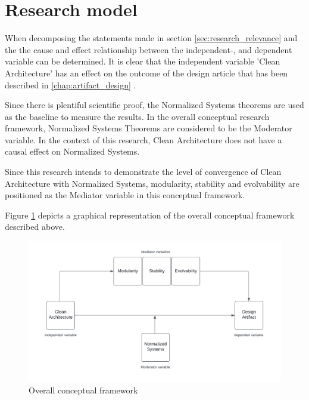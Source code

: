 \section{Research model} \label{research_model}

When decomposing the statements made in section \ref{sec:research_relevance}
 and the  the cause and
effect relationship between the independent-, and dependent variable can be determined. It
is clear that the independent variable 'Clean Architecture' has an effect on the outcome
of the design article that has been described in \ref{chap:artifact_design}
. 

Since there is plentiful scientific proof, the Normalized Systems theorems are used as the
baseline to measure the results. In the overall conceptual research framework, Normalized
Systems Theorems are considered to be the Moderator variable. In the context of this
research, Clean Architecture does not have a causal effect on Normalized Systems.

Since this research intends to demonstrate the level of convergence of Clean Architecture
with Normalized Systems, modularity, stability and evolvability are positioned as the
Mediator variable in this conceptual framework.

Figure \ref{fig:conceptual_framework}  depicts a
graphical representation of the overall conceptual framework described above.

\begin{figure}[H]
    \centering
    \includegraphics[width=1\textwidth]{Figures/conceptual_framework}
    \caption[Overall conceptual framework]{Overall conceptual framework}
    \label{fig:conceptual_framework}
\end{figure}

